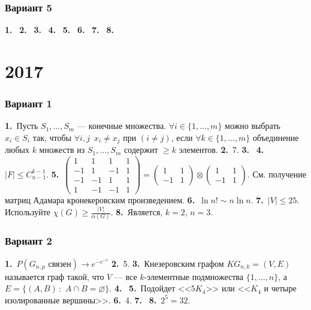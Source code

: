 \documentclass[oneside]{book}
\begin{document}
\subsubsection{Вариант 5}

\textbf{1.}~
\textbf{2.}~
\textbf{3.}~
\textbf{4.}~
\textbf{5.}~
\textbf{6.}~
\textbf{7.}~
\textbf{8.}~

\section{2017}
\subsubsection{Вариант 1}

\textbf{1.}~Пусть $S_1, \ldots, S_m$ --- конечные множества. $\forall i \in \{1, \ldots, m\}$ можно выбрать $x_i \in S_i$ так, чтобы $\forall i, j\,\,\,x_i \neq x_j$ при $(i \neq j)$, если $\forall k \in \{1, \ldots, m\}$ объединение любых $k$ множеств из $S_1, \ldots, S_m$ содержит $\geqslant k$ элементов.
\textbf{2.}~7.
\textbf{3.}~
\textbf{4.}~$|F| \leqslant C_{n-1}^{k-1}$.
\textbf{5.}~$\begin{pmatrix}
1 & 1 & 1 & 1 \\
-1 & 1 & -1 & 1 \\
-1 & -1 & 1 & 1 \\
1 & -1 & -1 & 1
\end{pmatrix} = \begin{pmatrix}
1 & 1 \\
-1 & 1
\end{pmatrix} \otimes \begin{pmatrix}
1 & 1 \\
-1 & 1
\end{pmatrix}$. См. получение матриц Адамара кронекеровским произведением.
\textbf{6.}~$\ln n! \sim n \ln n$.
\textbf{7.}~$|V| \leqslant 25$. Используйте $\chi(G) \geqslant \frac{|V|}{\alpha(G)}$. 
\textbf{8.}~Является, $k = 2$, $n = 3$.

\subsubsection{Вариант 2}

\textbf{1.}~$P(G_{n,p} \,\,\text{связен}) \rightarrow e^{-e^{-c}}$
\textbf{2.}~5.
\textbf{3.}~Кнезеровским графом $KG_{n, k} = (V, E)$ называется граф такой, что $V$ --- все $k$-элементные подмножества $\{1, \ldots, n\}$, а $E = \{(A, B)\,\colon\,\,A \cap B = \varnothing\}$.
\textbf{4.}~
\textbf{5.}~Подойдет  <<$5K_4$>> или <<$K_4$ и четыре изолированные вершины>>.
\textbf{6.}~4.
\textbf{7.}~
\textbf{8.}~$2^5 = 32$.
\end{document}
